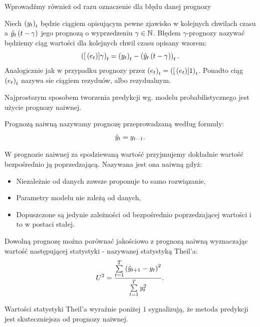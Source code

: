 \documentclass[10pt,a4paper]{book}
\begin{document}
Wprowadźmy również od razu oznaczenie dla błędu danej prognozy

\begin{definition}
Niech $\left( {y_t} \right)_{t}^{} $ będzie ciągiem opisującym pewne zjawisko w kolejnych chwilach czasu a $\predict[t-\gamma]{y}{t}$ jego prognozą o wyprzedzeniu $\gamma \in \mathbb{N}$. Błędem $\gamma$-prognozy nazywać będziemy ciąg wartości dla kolejnych chwil czasu opisany wzorem:
$$
\sequence{\function[{e_t}]{\gamma}}{t}{} = \sequence{y_t}{t}{} - \sequence{\predict[t-\gamma]{y}{t}}{t}{}.
$$
Analogicznie jak w przypadku prognozy przez $\left( {e_t} \right)_{t}^{} = \left( {{{[}\left( {e_t} \right)}]{1} } \right)_{t}^{} $. Ponadto ciąg $\left( {e_t} \right)_{t}^{} $ nazywa sie ciągiem rezyduów, albo rezydualnym.
\end{definition}

Najprostszym sposobem tworzenia predykcji wg. modelu probabilistycznego jest użycie prognozy naiwnej.

\begin{definition}
Prognozą naiwną nazywamy prognozę przeprowadzaną według formuły:
$$
\predict{y}{t} = y_{t-1}.
$$
\end{definition}


W prognozie naiwnej za spodziewaną wartość przyjmujemy dokładnie wartość bezpośrednio ją poprzedzającą. Nazywana jest ona naiwną gdyż:
\begin{itemize}
\item Niezależnie od danych zawsze proponuje to samo rozwiązanie,
\item Parametry modelu nie zależą od danych,
\item Dopuszczone są jedynie zależności od bezpośrednio poprzedzającej wartości i to w postaci stałej.
\end{itemize}

\begin{definition}
Dowolną prognozę można porównać jakościowo z prognozą naiwną wyznaczając wartość następującej statystyki - nazywanej statystyką Theil'a:
$$
U^2 = \frac{\sum_{t = 1}^{T} \bracket{\predict{y}{t+1} - y_t }^2}{\sum_{t=1}^{T} y_t^2}.
$$
\end{definition}
Wartości statystyki Theil'a wyraźnie poniżej $1$ sygnalizują, że metoda predykcji jest skuteczniejsza od prognozy naiwnej.
\end{document}
